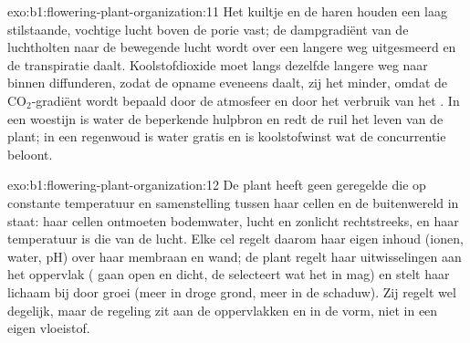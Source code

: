 \begin{solution}{exo:b1:flowering-plant-organization:11}
Het kuiltje en de haren houden een laag stilstaande, vochtige lucht boven de
porie vast; de dampgradiënt van de luchtholten naar de bewegende lucht wordt over
een langere weg uitgesmeerd en de transpiratie daalt. Koolstofdioxide moet langs
dezelfde langere weg naar binnen diffunderen, zodat de opname eveneens daalt, zij
het minder, omdat de $\mathrm{CO_2}$-gradiënt wordt bepaald door de atmosfeer en
door het verbruik van het . In een woestijn is water de beperkende
hulpbron en redt de ruil het leven van de plant; in een regenwoud is water gratis
en is koolstofwinst wat de concurrentie beloont.
\end{solution}

\begin{solution}{exo:b1:flowering-plant-organization:12}
De plant heeft geen geregelde  die op constante
temperatuur en samenstelling tussen haar cellen en de buitenwereld in staat:
haar cellen ontmoeten bodemwater, lucht en zonlicht rechtstreeks, en haar
temperatuur is die van de lucht. Elke cel regelt daarom haar eigen inhoud
(ionen, water, pH) over haar membraan en wand; de plant regelt haar
uitwisselingen aan het oppervlak ( gaan open en dicht, de 
selecteert wat het  in mag) en stelt haar lichaam bij door groei (meer
 in droge grond, meer  in de schaduw). Zij regelt wel degelijk,
maar de regeling zit aan de oppervlakken en in de vorm, niet in een eigen
vloeistof.
\end{solution}

